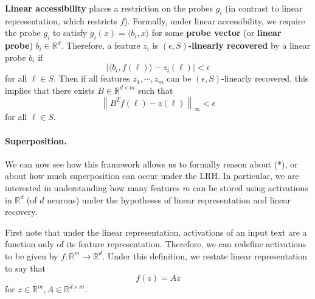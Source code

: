 \documentclass[11pt]{article}
\newcommand{\RR}{\mathbb{R}}
\newcommand{\norm}[1]{\left\|#1\right\|}
\begin{document}
\textbf{Linear accessibility} places a restriction on the probes $g_i$ (in contrast to linear representation, which restricts $f$). Formally, under linear accessibility, we require the probe $g_i$ to satisfy $g_i(x) = \langle b_i, x\rangle$ for some \textbf{probe vector} (or \textbf{linear probe}) $b_i\in \RR^d$. Therefore, a feature $z_i$ is \textbf{$(\epsilon,S)$-linearly recovered} by a linear probe $b_i$ if
\begin{equation}
    |\langle b_i, f(\ell)\rangle - z_i(\ell)| < \epsilon
\end{equation}
for all $\ell \in S.$ Then if all features $z_1,\cdots,z_m$ can be $(\epsilon,S)$-linearly recovered, this implies that there exists $B\in \RR^{d\times m}$ such that
\begin{equation}
    \norm{B^T f(\ell) - z(\ell)}_\infty < \epsilon
\end{equation}
for all $\ell\in S.$

\paragraph{Superposition.} We can now see how this framework allows us to formally reason about (*), or about how much superposition can occur under the LRH. In particular, we are interested in understanding how many features $m$ can be stored using activations in $\RR^d$ (of $d$ neurons) under the hypotheses of linear representation and linear recovery.

First note that under the linear representation, activations of an input text are a function only of its feature representation. Therefore, we can redefine activations to be given by $f:\RR^m\rightarrow \RR^d$. Under this definition, we restate linear representation to say that
\begin{equation}
    f(z) = Az
\end{equation}
for $z\in \RR^m, A\in \RR^{d\times m}.$
\end{document}
